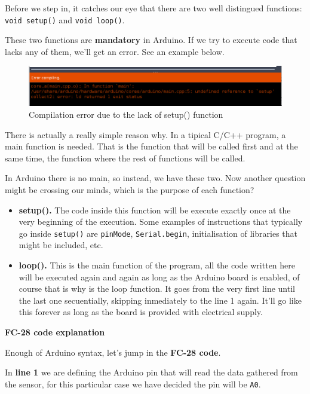 Before we step in, it catches our eye that there are two well distingued functions: \verb|void setup()| and \verb|void loop()|.

These two functions are \textbf{mandatory} in Arduino. If we try to execute code that lacks any of them, we'll get an error. See an example below.

\begin{figure}[H]
    \centering
    \includegraphics[width=1.065\textwidth]{fig/mandatory-fuct-error.png}
    \caption{Compilation error due to the lack of setup() function}
    \label{fig:mandatory-fuct-error}
\end{figure}
There is actually a really simple reason why. In a tipical C/C++ program, a main function is needed. That is the function that will be called first and at the same time, the function where the rest of functions will be called.

In Arduino there is no main, so instead, we have these two. Now another question might be crossing our minds, which is the purpose of each function?

\begin{itemize}
	\item \textbf{setup().} The code inside this function will be execute exactly once at the very beginning of the execution. Some examples of instructions that typically go inside \verb|setup()| are \verb|pinMode|, \verb|Serial.begin|, initialisation of libraries that might be included, etc.
	\item \textbf{loop().} This is the main function of the program, all the code written here will be executed again and again as long as the Arduino board is enabled, of course that is why is the loop function. It goes from the very first line until the last one secuentially, skipping inmediately to the line 1 again. It'll go like this forever as long as the board is provided with electrical supply.
\end{itemize}

\vspace{7mm}

\textbf{FC-28 code explanation}

Enough of Arduino syntax, let's jump in the \textbf{FC-28 code}.

In \textbf{line 1} we are defining the Arduino pin that will read the data gathered from the sensor, for this particular case we have decided the pin will be \verb|A0|.

